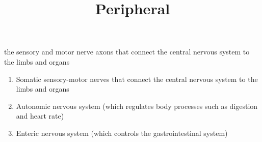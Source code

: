 \documentclass[a4paper]{article}
\title{Peripheral}
\date{}
\begin{document}
    \maketitle
    the sensory and motor nerve axons that connect the central nervous system to the limbs and organs
    \begin{enumerate}
        \item Somatic sensory-motor nerves that connect the central nervous system to the limbs and organs
        \item Autonomic nervous system (which regulates body processes such as digestion and heart rate)
        \item Enteric nervous system (which controls the gastrointestinal system)
    \end{enumerate}
\end{document}
